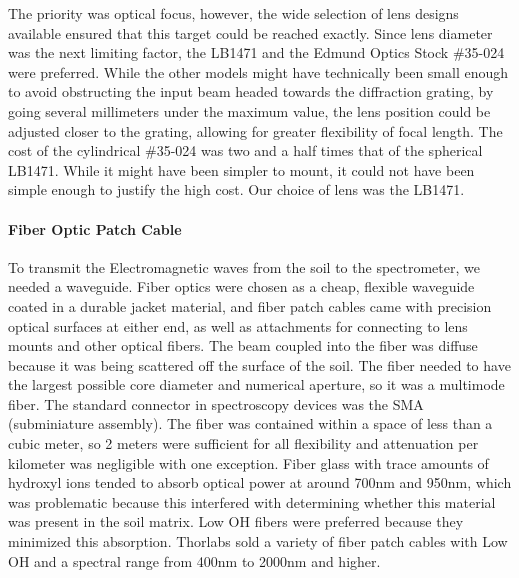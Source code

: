 The priority was optical focus, however, the wide selection of lens designs available ensured that this target could be reached exactly. Since lens diameter was the next limiting factor, the LB1471 and the Edmund Optics Stock \#35-024 were preferred. While the other models might have technically been small enough to avoid obstructing the input beam headed towards the diffraction grating, by going several millimeters under the maximum value, the lens position could be adjusted closer to the grating, allowing for greater flexibility of focal length. The cost of the cylindrical \#35-024 was two and a half times that of the spherical LB1471. While it might have been simpler to mount, it could not have been simple enough to justify the high cost. Our choice of lens was the LB1471.
\paragraph{Fiber Optic Patch Cable}
To transmit the Electromagnetic waves from the soil to the spectrometer, we needed a waveguide. Fiber optics were chosen as a cheap, flexible waveguide coated in a durable jacket material, and fiber patch cables came with precision optical surfaces at either end, as well as attachments for connecting to lens mounts and other optical fibers. The beam coupled into the fiber was diffuse because it was being scattered off the surface of the soil. The fiber needed to have the largest possible core diameter and numerical aperture, so it was a multimode fiber. The standard connector in spectroscopy devices was the SMA (subminiature assembly). The fiber was contained within a space of less than a cubic meter, so 2 meters were sufficient for all flexibility and attenuation per kilometer was negligible with one exception. Fiber glass with trace amounts of hydroxyl ions tended to absorb optical power at around 700nm and 950nm, which was problematic because this interfered with determining whether this material was present in the soil matrix. Low OH fibers were preferred because they minimized this absorption. Thorlabs sold a variety of fiber patch cables with Low OH and a spectral range from 400nm to 2000nm and higher.

